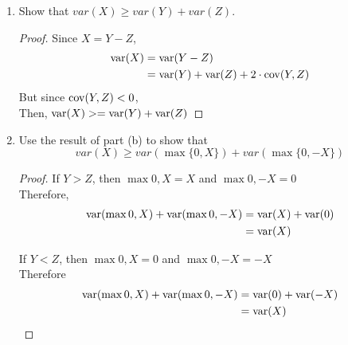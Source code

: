 \documentclass[paper=usletter, fontsize=12pt]{article}
\begin{document}
\begin{enumerate}
\begin{enumerate}
\begin{proof}
                \begin{align*}
                    \cov{Y, Z} &= E[(Y - E(Y))(Z - E(Z))]\\
                    &=E[YZ-2Y\cdot E(Z)-E(Z)^2] \\
                    &=E(YZ)-2\cdot E(Y)\cdot E(Z)-E(Z)^2 \\
                    &=-2\cdot E(Y)\cdot E(Z)-E(Z)^2 < 0  \qedhere
                \end{align*}

            \end{proof}

            \item Show that $var(X) \ge var(Y)+var(Z)$.
            \begin{proof}

                Since $X=Y-Z$,
                \begin{align*}
                    \operatorname{var}(X) &=\operatorname{var}(Y-Z) \\
                    &= \operatorname{var}(Y)+\operatorname{var}(Z)+2 \cdot\operatorname{cov}(Y,Z)
                \end{align*}
                But since $\operatorname{cov}(Y,Z)< 0$, \\
                Then, $\operatorname{var}(X) >=\operatorname{var}(Y)+\operatorname{var}(Z)$ \qedhere

            \end{proof}

            \item Use the result of part (b) to show that
            \begin{equation*}
                var(X) \ge var(\max\{0,X\})+var(\max\{0,-X\})
            \end{equation*}
            \begin{proof}

                If $Y>Z$, then $\max{0,X}=X$ and $\max{0,-X}=0$\\
                Therefore,
                \begin{align*}
                    \operatorname{var}(\max{0,X})+\operatorname{var}(\max{0,-X}) &=\operatorname{var}(X)+\operatorname{var}(0)\\
                    & =\operatorname{var}(X)
                \end{align*}

                If $Y<Z$, then $\max{0,X}=0$ and $\max{0,-X}=-X$\\
                Therefore
                \begin{align*}
                    \operatorname{var}(\max{0,X})+\operatorname{var}(\max{0,-X}) &=\operatorname{var}(0)+\operatorname{var}(-X)\\
                    & =\operatorname{var}(X)
                \end{align*}


\end{proof}
\end{enumerate}
\end{enumerate}
\end{document}
